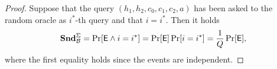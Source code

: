 \begin{proof}
Suppose that the query $(h_1, h_2,c_0,c_1,c_2,a)$ has been asked to the random oracle as $i^*$-th query and that $i=i^*$. Then it holds
\[\mathbf{Snd}^\Sigma_{\mathcal{B}} = \Pr[\mathsf{E} \land i=i^*] = \Pr[\mathsf{E}]\Pr[i=i^*] = \frac{1}{Q}\Pr[\mathsf{E}],\]
where the first equality holds since the events are independent.

%


%




\end{proof}
